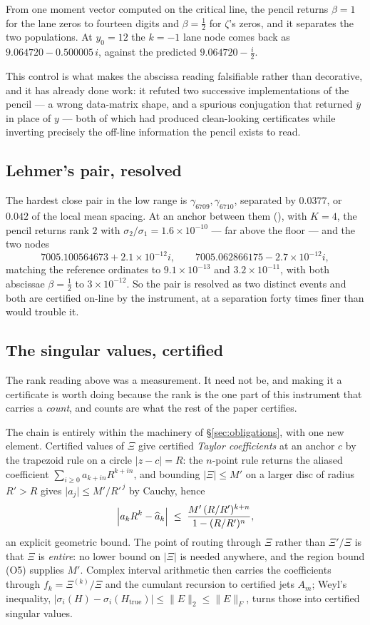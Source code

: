 \documentclass[11pt]{article}
\theoremstyle{plain}
\theoremstyle{definition}
\theoremstyle{remark}
\newcommand{\lean}[1]{\texttt{\detokenize{#1}}}
\begin{document}
\noindent
From one moment vector computed on the critical line, the pencil returns $\beta=1$ for
the lane zeros to fourteen digits and $\beta=\tfrac12$ for $\zeta$'s zeros, and it
separates the two populations. At $y_0=12$ the $k=-1$ lane node comes back as
$9.064720-0.500005\,i$, against the predicted $9.064720-\tfrac{i}{2}$.

This control is what makes the abscissa reading falsifiable rather than decorative, and
it has already done work: it refuted two successive implementations of the pencil --- a
wrong data-matrix shape, and a spurious conjugation that returned $\overline{y}$ in
place of $y$ --- both of which had produced clean-looking certificates while inverting
precisely the off-line information the pencil exists to read.

\subsection{Lehmer's pair, resolved}
The hardest close pair in the low range is $\gamma_{6709},\gamma_{6710}$, separated by
$0.0377$, or $0.042$ of the local mean spacing. At an anchor between them
(\lean{extractor/checks/lehmer_rank.py}), with $K=4$, the pencil returns rank $2$ with
$\sigma_2/\sigma_1=1.6\times10^{-10}$ --- far above the floor --- and the two nodes
\[
  7005.100564673+2.1\times10^{-12}i,\qquad
  7005.062866175-2.7\times10^{-12}i,
\]
matching the reference ordinates to $9.1\times10^{-13}$ and $3.2\times10^{-11}$, with
both abscissae $\beta=\tfrac12$ to $3\times10^{-12}$. So the pair is resolved as two
distinct events and both are certified on-line by the instrument, at a separation forty
times finer than would trouble it.

\subsection{The singular values, certified}\label{sec:certrank}
The rank reading above was a measurement. It need not be, and making it a certificate is
worth doing because the rank is the one part of this instrument that carries a
\emph{count}, and counts are what the rest of the paper certifies.

The chain is entirely within the machinery of \S\ref{sec:obligations}, with one new
element. Certified values of $\Xi$ give certified \emph{Taylor coefficients} at an anchor
$c$ by the trapezoid rule on a circle $\lvert z-c\rvert=R$: the $n$-point rule returns the
aliased coefficient $\sum_{i\ge0}a_{k+in}R^{k+in}$, and bounding $\lvert\Xi\rvert\le M'$ on
a larger disc of radius $R'>R$ gives $\lvert a_j\rvert\le M'/R'^{\,j}$ by Cauchy, hence
\[
  \Bigl\lvert a_kR^k-\widehat a_k\Bigr\rvert
  \;\le\;\frac{M'\,(R/R')^{k+n}}{1-(R/R')^{n}} ,
\]
an explicit geometric bound. The point of routing through $\Xi$ rather than $\Xi'/\Xi$ is
that $\Xi$ is \emph{entire}: no lower bound on $\lvert\Xi\rvert$ is needed anywhere, and
the region bound (O5) supplies $M'$. Complex interval arithmetic then carries the
coefficients through $f_k=\Xi^{(k)}/\Xi$ and the cumulant recursion to certified jets
$A_m$; Weyl's inequality,
$\lvert\sigma_i(H)-\sigma_i(H_{\text{true}})\rvert\le\lVert E\rVert_2\le\lVert E\rVert_F$,
turns those into certified singular values.
\end{document}
